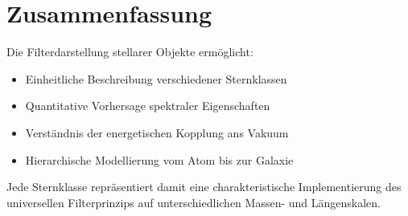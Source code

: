 \section{Zusammenfassung}

Die Filterdarstellung stellarer Objekte ermöglicht:
\begin{itemize}
\item Einheitliche Beschreibung verschiedener Sternklassen
\item Quantitative Vorhersage spektraler Eigenschaften
\item Verständnis der energetischen Kopplung ans Vakuum
\item Hierarchische Modellierung vom Atom bis zur Galaxie
\end{itemize}

Jede Sternklasse repräsentiert damit eine charakteristische Implementierung des universellen Filterprinzips auf unterschiedlichen Massen- und Längenskalen.
